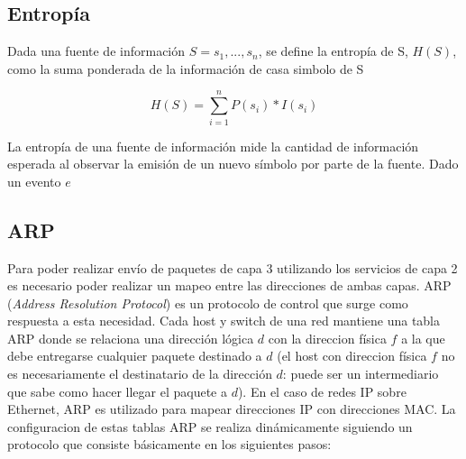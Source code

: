 \subsection{Entropía}

Dada una fuente de información $S={s_{1},...,s_{n}}$, se define la entropía de S, $H(S)$, como la suma ponderada de la información de casa simbolo de S

$$H(S)=\sum^{n}_{i=1}{P(s_{i})*I(s_{i})}$$

La entropía de una fuente de información mide la cantidad de información esperada al observar la emisión de un nuevo símbolo por parte de la fuente. Dado un evento $e$

\subsection{ARP}

Para poder realizar envío de paquetes de capa 3 utilizando los servicios de capa 2 es necesario poder realizar un mapeo entre las direcciones de ambas capas. ARP (\textsl{Address Resolution Protocol}) es un protocolo de control que surge como respuesta a esta necesidad. Cada host y switch de una red mantiene una tabla ARP donde se relaciona una dirección lógica $d$ con la direccion física $f$ a la que debe entregarse cualquier paquete destinado a $d$ (el host con direccion física $f$ no es necesariamente el destinatario de la dirección $d$: puede ser un intermediario que sabe como hacer llegar el paquete a $d$). En el caso de redes IP sobre Ethernet, ARP es utilizado para mapear direcciones IP con direcciones MAC. 
La configuracion de estas tablas ARP se realiza dinámicamente siguiendo un protocolo que consiste básicamente en los siguientes pasos:

